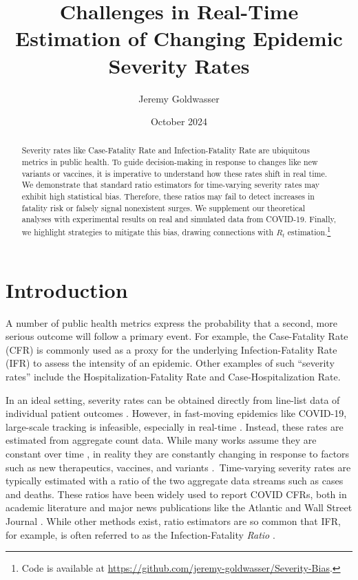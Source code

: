 \documentclass{article}
\title{Challenges in Real-Time Estimation of Changing Epidemic Severity Rates}
\author{Jeremy Goldwasser}
\date{October 2024}
\begin{document}
\maketitle
\begin{abstract}
    Severity rates like Case-Fatality Rate and Infection-Fatality Rate are ubiquitous metrics in public health. To guide decision-making in response to changes like new variants or vaccines, it is imperative to understand how these rates shift in real time. We demonstrate that standard ratio estimators for time-varying severity rates may exhibit high statistical bias. Therefore, these ratios may fail to detect increases in fatality risk or falsely signal nonexistent surges. We supplement our theoretical analyses with experimental results on real and simulated data from COVID-19. Finally, we highlight strategies to mitigate this bias, drawing connections with $R_t$ estimation.\footnote{Code is available at \url{https://github.com/jeremy-goldwasser/Severity-Bias}.}
\end{abstract}
\section{Introduction}

A number of public health metrics express the probability that a second, more serious outcome will follow a primary event. For example, the Case-Fatality Rate (CFR) is commonly used as a proxy for the underlying Infection-Fatality Rate (IFR) to assess the intensity of an epidemic. Other examples of such “severity rates” include the Hospitalization-Fatality Rate and Case-Hospitalization Rate. 

In an ideal setting, severity rates can be obtained directly from line-list data of individual patient outcomes \citep{HFR_line_list1,HFR_linelist2,HFR_linelist3,cfr_line_list}. However, in fast-moving epidemics like COVID-19, large-scale tracking is infeasible, especially in real-time \citep{UKpaper}. Instead, these rates are estimated from aggregate count data. While many works assume they are constant over time \citep{reich2012estimating,ghani,jewell2007nonparametric,lancet_controversial}, in reality they are constantly changing in response to factors such as new therapeutics, vaccines, and variants \citep{nyt}. Time-varying severity rates are typically estimated with a ratio of the two aggregate data streams such as cases and deaths. These ratios have been widely used to report COVID CFRs, both in academic literature \citep{germany,horita2022global,timevar_ifr,yuan2020monitoring,LIU2023100350} and major news publications like the Atlantic \citep{atlantic} and Wall Street Journal \citep{wsj}. While other methods exist, ratio estimators are so common that IFR, for example, is often referred to as the Infection-Fatality \textit{Ratio} \citep{timevar_ifr, lancet_ifr}.
\end{document}
